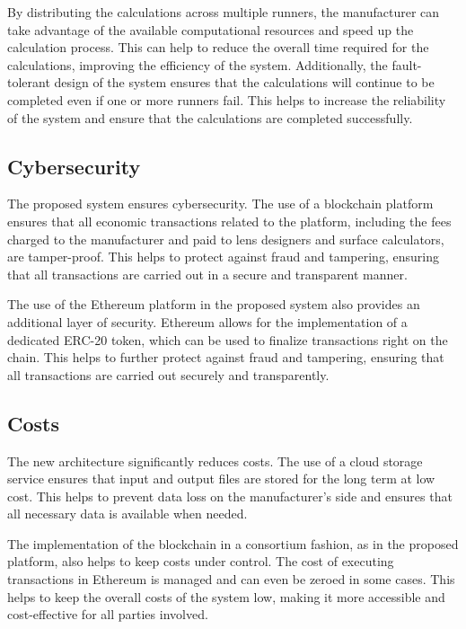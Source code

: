 \documentclass[10pt,a4paper]{report}
\begin{document}
\large\justify By distributing the calculations across multiple runners, the manufacturer can take advantage of the available computational resources and speed up the calculation process. This can help to reduce the overall time required for the calculations, improving the efficiency of the system. Additionally, the fault-tolerant design of the system ensures that the calculations will continue to be completed even if one or more runners fail. This helps to increase the reliability of the system and ensure that the calculations are completed successfully.

\subsection{Cybersecurity}
\large\justify The proposed system ensures cybersecurity. The use of a blockchain platform ensures that all economic transactions related to the platform, including the fees charged to the manufacturer and paid to lens designers and surface calculators, are tamper-proof. This helps to protect against fraud and tampering, ensuring that all transactions are carried out in a secure and transparent manner.

\large\justify The use of the Ethereum platform in the proposed system also provides an additional layer of security. Ethereum allows for the implementation of a dedicated ERC-20 token, which can be used to finalize transactions right on the chain. This helps to further protect against fraud and tampering, ensuring that all transactions are carried out securely and transparently.

\subsection{Costs}
\large\justify The new architecture significantly reduces costs. The use of a cloud storage service ensures that input and output files are stored for the long term at low cost. This helps to prevent data loss on the manufacturer's side and ensures that all necessary data is available when needed.

\large\justify The implementation of the blockchain in a consortium fashion, as in the proposed platform, also helps to keep costs under control. The cost of executing transactions in Ethereum is managed and can even be zeroed in some cases. This helps to keep the overall costs of the system low, making it more accessible and cost-effective for all parties involved.


\newpage
\end{document}
